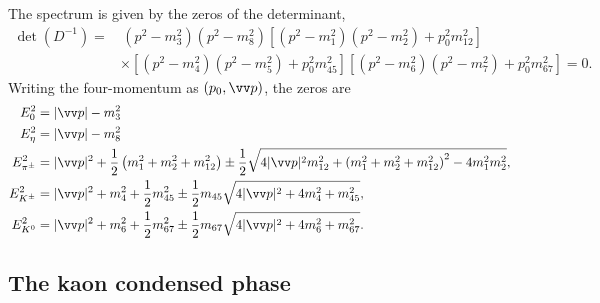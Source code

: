 %
The spectrum is given by the zeros of the determinant,
%
\begin{align}
    \nonumber
    \det\left(D^{-1}\right)
    =&\,
    (p^2 - m_3^2)(p^2 - m_8^2)
    \left[ (p^2 - m_1^2)(p^2 - m_2^2) + p_0^2m_{12}^2  \right]\\
    &\times
    \left[ (p^2 - m_4^2)(p^2 - m_5^2) + p_0^2m_{45}^2  \right]\left[ (p^2 - m_6^2)(p^2 - m_7^2) + p_0^2m_{67}^2  \right]
    = 0.
\end{align}
%
Writing the four-momentum as $(p_0, \vv p)$, the zeros are
%
\begingroup
\allowdisplaybreaks
\begin{align}
    E_0^2 &= |\vv p | - m_3^2 \\
    E_\eta^2 &= |\vv p | - m_8^2 \\
    E_\pipm^2
    & = |\vv p|^2 +
    \frac{1}{2}
    \left(
        m_1^2 + m_2^2 + m_{12}^2 
    \right)
    \pm 
    \frac{1}{2}
    \sqrt{
        4|\vv p|^2m_{12}^2 
        +
        \left(
            m_1^2 + m_2^2 + m_{12}^2
        \right)^2
        - 4 m_1^2 m_2^2
    }, \\
    E_\Kpm^2
    & = |\vv p|^2 + m_4^2 + \frac{1}{2} m_{45}^2 
    \pm
    \frac{1}{2} m_{45} \sqrt{4|\vv p|^2 + 4 m_4^2 + m_{45}^2},\\
    E_\Ko^2
    &= |\vv p|^2 + m_6^2 + \frac{1}{2} m_{67}^2 
    \pm
    \frac{1}{2} m_{67} \sqrt{4|\vv p|^2 + 4 m_6^2 + m_{67}^2}.
\end{align}
\endgroup
{}






\subsection{The kaon condensed phase}


